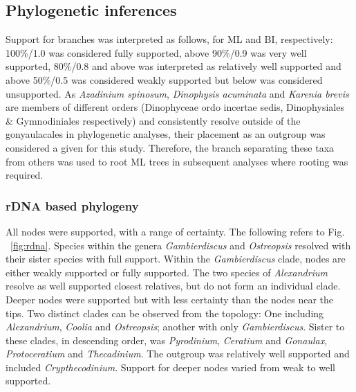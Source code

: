 \documentclass[fleqn,10pt,lineno]{wlpeerj} %
\begin{document}
\subsection*{Phylogenetic inferences}
Support for branches was interpreted as follows, for ML and BI, respectively: 100\%/1.0 was considered fully supported, above 90\%/0.9 was very well supported, 80\%/0.8 and above was interpreted as relatively well supported and above 50\%/0.5 was considered weakly supported but below was considered unsupported.
As \emph{Azadinium spinosum}, \emph{Dinophysis acuminata} and \emph{Karenia brevis} are members of different orders (Dinophyceae ordo incertae sedis, Dinophysiales \& Gymnodiniales respectively) and consistently resolve outside of the gonyaulacales in phylogenetic analyses, their placement as an outgroup was considered a given for this study. 
Therefore, the branch separating these taxa from others was used to root ML trees in subsequent analyses where rooting was required.
\subsubsection*{rDNA based phylogeny}
All nodes were supported, with a range of certainty.
The following refers to Fig. ~\ref{fig:rdna}.
Species within the genera \emph{Gambierdiscus} and \emph{Ostreopsis} resolved with their sister species with full support. 
Within the \emph{Gambierdiscus} clade, nodes are either weakly supported or fully supported. 
The two species of \emph{Alexandrium} resolve as well supported closest relatives, but do not form an individual clade. 
Deeper nodes were supported but with less certainty than the nodes near the tips. 
Two distinct clades can be observed from the topology: One including \emph{Alexandrium}, \emph{Coolia} and \emph{Ostreopsis}; another with only \emph{Gambierdiscus}. 
Sister to these clades, in descending order, was \emph{Pyrodinium}, \emph{Ceratium} and \emph{Gonaulax}, \emph{Protoceratium} and \emph{Thecadinium}. 
The outgroup was relatively well supported and included \emph{Crypthecodinium}. 
Support for deeper nodes varied from weak to well supported.
\end{document}
